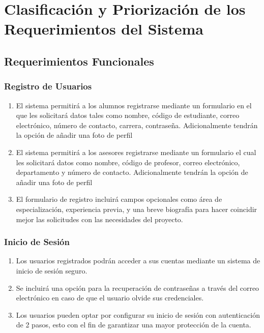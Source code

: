 	\clearpage
	\section{Clasificación y Priorización de los Requerimientos del Sistema}

	\subsection{Requerimientos Funcionales}

	\subsubsection{Registro de Usuarios}

	\begin{enumerate}
		\item El sistema permitirá a los alumnos registrarse mediante un formulario en
			el que les solicitará datos tales como nombre, código de estudiante, correo electrónico,
			número de contacto, carrera, contraseña. Adicionalmente tendrán la opción de
			añadir una foto de perfil

		\item El sistema permitirá a los asesores registrarse mediante un formulario el
			cual les solicitará datos como nombre, código de profesor, correo electrónico,
			departamento y número de contacto. Adicionalmente tendrán la opción de añadir
			una foto de perfil

		\item El formulario de registro incluirá campos opcionales como área de especialización,
			experiencia previa, y una breve biografía para hacer coincidir mejor las solicitudes
			con las necesidades del proyecto.
	\end{enumerate}

	\subsubsection{Inicio de Sesión}

	\begin{enumerate}
		\item Los usuarios registrados podrán acceder a sus cuentas mediante un sistema
			de inicio de sesión seguro.

		\item Se incluirá una opción para la recuperación de contraseñas a través del correo
			electrónico en caso de que el usuario olvide sus credenciales.

		\item Los usuarios pueden optar por configurar su inicio de sesión con autenticación
			de 2 pasos, esto con el fin de garantizar una mayor protección de la cuenta.
	\end{enumerate}

